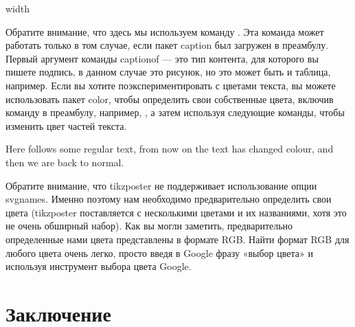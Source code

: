 \documentclass{article}
\begin{document}
\begin{columns}
\begin{column}{width}
\begin{center}
\end{center}

Обратите внимание, что здесь мы используем команду \captionof{}{}.
Эта команда может работать только в том случае, если пакет caption был загружен в преамбулу. Первый аргумент команды captionof —
это тип контента, для которого вы пишете подпись, в данном случае это
рисунок, но это может быть и таблица, например.
Если вы хотите поэкспериментировать с цветами текста, вы можете использовать пакет color,
чтобы определить свои собственные цвета, включив команду в преамбулу, например,
 , а затем используя следующие команды,
чтобы изменить цвет частей текста.


Here follows some regular text, \color{MyPink} from now on the
text has changed colour, \color{black} and then we are
back to normal.


Обратите внимание, что tikzposter не поддерживает использование опции svgnames.
 Именно поэтому нам необходимо предварительно определить свои цвета (tikzposter поставляется с несколькими цветами и их названиями,
  хотя это не очень обширный набор).
Как вы могли заметить, предварительно определенные нами цвета представлены в формате RGB. Найти формат RGB для любого цвета очень легко,
просто введя в Google фразу «выбор цвета» и используя инструмент выбора цвета Google.



  \section{Заключение}
  \label{sec:conclusion}


\end{column}
\end{columns}
\end{document}

